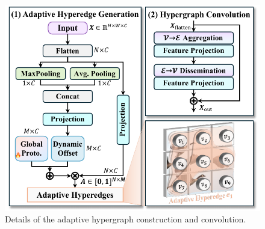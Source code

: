 \begin{figure}[t]
    \centering
    \includegraphics[width=1\linewidth]{figures/adaHC.pdf}
    \vspace{-0.6cm}
    \caption{Details of the adaptive hypergraph construction and convolution.}
    \vspace{-0.4cm}
    \label{fig:hyperace}
\end{figure}